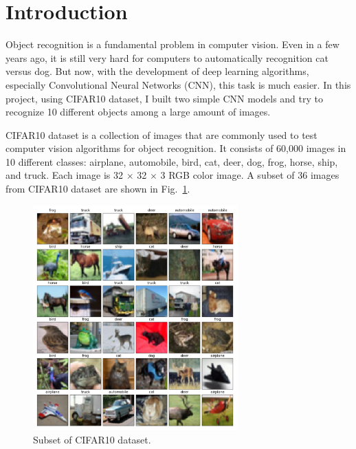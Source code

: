

\usepackage{graphicx, amssymb, amsmath, listings, float, mathtools}
\usepackage{color, url}
\lstset{language = Python}
\lstset{breaklines}
\lstset{extendedchars=false}

\oddsidemargin 0in
\evensidemargin 0in
\textwidth 6.5in
\topmargin -0.6in
\textheight 9.0in




\section{Introduction}
Object recognition is a fundamental problem in computer vision. Even in a few years ago, it is still very hard for computers to automatically recognition cat versus dog. But now, with the development of deep learning algorithms, especially Convolutional Neural Networks (CNN), this task is much easier. In this project, using CIFAR10 dataset, I built two simple CNN models and try to recognize 10 different objects among a large amount of images.

CIFAR10 dataset is a collection of images that are commonly used to test computer vision algorithms for object recognition. It consists of 60,000 images in 10 different classes: airplane, automobile, bird, cat, deer, dog, frog, horse, ship, and truck. Each image is 32 $\times$ 32 $\times$ 3 RGB color image. A subset of 36 images from CIFAR10 dataset are shown in Fig.~\ref{fig:utility}.

\begin{figure}[htbp]
\centering
\includegraphics[width=0.70\textwidth]{./figures/snapshot.png}
\caption{Subset of CIFAR10 dataset.}
\label{fig:utility} 
\end{figure}


